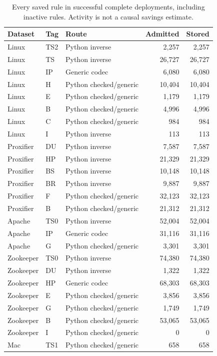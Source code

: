 \begin{longtable}{lllrr}
\caption{Every saved rule in successful complete deployments, including inactive rules. Activity is not a causal savings estimate.}\\
\toprule
Dataset & Tag & Route & Admitted & Stored \\ \midrule\endhead
Linux & TS2 & Python inverse & 2,257 & 2,257 \\
Linux & TS & Python inverse & 26,727 & 26,727 \\
Linux & IP & Generic codec & 6,080 & 6,080 \\
Linux & H & Python checked/generic & 10,404 & 10,404 \\
Linux & E & Python checked/generic & 1,179 & 1,179 \\
Linux & B & Python checked/generic & 4,996 & 4,996 \\
Linux & C & Python checked/generic & 984 & 984 \\
Linux & I & Python inverse & 113 & 113 \\
Proxifier & DU & Python inverse & 7,587 & 7,587 \\
Proxifier & HP & Python inverse & 21,329 & 21,329 \\
Proxifier & BS & Python inverse & 10,148 & 10,148 \\
Proxifier & BR & Python inverse & 9,887 & 9,887 \\
Proxifier & F & Python checked/generic & 32,123 & 32,123 \\
Proxifier & B & Python checked/generic & 21,312 & 21,312 \\
Apache & TS0 & Python inverse & 52,004 & 52,004 \\
Apache & IP & Generic codec & 31,116 & 31,116 \\
Apache & G & Python checked/generic & 3,301 & 3,301 \\
Zookeeper & TS0 & Python inverse & 74,380 & 74,380 \\
Zookeeper & DU & Python inverse & 1,322 & 1,322 \\
Zookeeper & HP & Generic codec & 68,303 & 68,303 \\
Zookeeper & E & Python checked/generic & 3,856 & 3,856 \\
Zookeeper & G & Python checked/generic & 1,749 & 1,749 \\
Zookeeper & B & Python checked/generic & 53,065 & 53,065 \\
Zookeeper & I & Python checked/generic & 0 & 0 \\
Mac & TS1 & Python checked/generic & 658 & 658 \\

\end{longtable}
